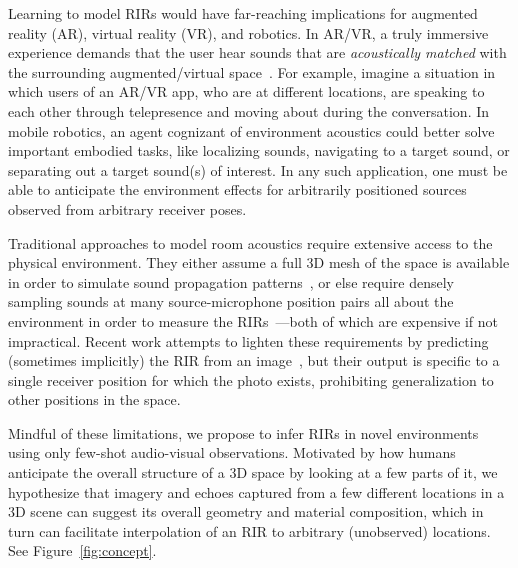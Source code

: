 Learning to model RIRs would have far-reaching implications for augmented reality (AR), virtual reality (VR), and robotics. In AR/VR, a truly immersive experience demands that the user hear sounds that are \emph{acoustically matched} with the surrounding augmented/virtual space~\citep{app11031150}. For example, imagine a situation in which users of an AR/VR app, who are at different locations, are speaking to each other through telepresence and moving about during the conversation. In mobile robotics, an agent cognizant of environment acoustics could better solve important embodied tasks, like localizing sounds, navigating to a target sound, or separating out a target sound(s) of interest.  In any such application, one must be able to anticipate the environment effects for arbitrarily positioned sources observed from arbitrary receiver poses.

Traditional approaches to model room acoustics require extensive access to the physical environment.  They either assume a full 3D mesh of the space is available in order to simulate sound propagation patterns~\citep{chen2020soundspaces,4117929}, or else require densely sampling sounds at many source-microphone position pairs all about the environment in order to measure the RIRs~\cite{Holters2009IMPULSERM,stan2002comparison}---both of which are expensive if not impractical. Recent work attempts to lighten these requirements by predicting (sometimes implicitly) the RIR from an image~\citep{singh2021image2reverb, kon2019estimation, gao20192, DBLP:journals/corr/abs-2007-09902, Xu_2021_CVPR, Rachavarapu_2021_ICCV, chen2022visual}, but their output is specific to a single receiver position for which the photo exists, prohibiting generalization to other positions in the space.

Mindful of these limitations, we propose to infer RIRs in novel environments using only few-shot audio-visual observations. Motivated by how humans anticipate the overall structure of a 3D space by looking at a few parts of it, we hypothesize that imagery and echoes captured from a few different locations in a 3D scene can suggest its overall geometry and material composition, which in turn can facilitate interpolation of an RIR to arbitrary (unobserved) locations.  See Figure~\ref{fig:concept}. 

